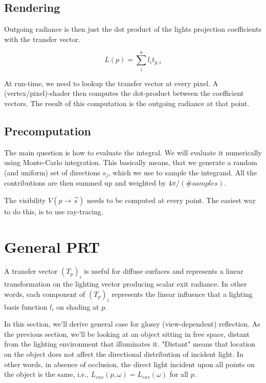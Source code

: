 \subsection{Rendering}
Outgoing radiance is then just the dot product of the lights projection coefficients with the transfer vector.

\begin{equation*}
	L(p)=\sum^{n}_{i}l_it_{p,i}
\end{equation*}

At run-time, we need to lookup the transfer vector at every pixel. A (vertex/pixel)-shader then computes the dot-product between the coefficient vectors. The result of this computation is the outgoing radiance at that point.




\subsection{Precomputation}
The main question is how to evaluate the integral. We will evaluate it numerically using Monte-Carlo integration. This basically means, that we generate a random (and uniform) set of directions $s_j$, which we use to sample the integrand. All the contributions are then summed up and weighted by $4\pi/(\#samples)$.

The visibility $V(p\to \vec{s})$ needs to be computed at every point. The easiest way to do this, is to use ray-tracing.




\section{General PRT}
A transfer vector $(T_p)_i$ is useful for diffuse surfaces and represents a linear transformation on the lighting vector producing scalar exit radiance. In other words, each component of $(T_p)_i$ represents the linear influence that a lighting basis function $l_i$ on shading at $p$.

In this section, we'll derive general case for glossy (view-dependent) reflection. As the previous section, we'll be looking at an object sitting in free space, distant from the lighting environment that illuminates it. "Distant" means that location on the object does not affect the directional distribution of incident light. In other words, in absence of occlusion, the direct light incident upon all points on the object is the same, i.e., $L_{env}(p,\omega)=L_{env}(\omega)$ for all $p$.

